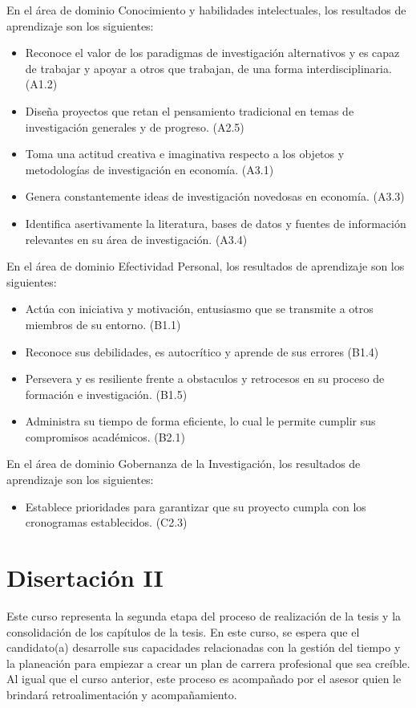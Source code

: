 En el área de dominio Conocimiento y habilidades intelectuales, los resultados de aprendizaje son los siguientes:
\begin{itemize}
\item	Reconoce el valor de los paradigmas de investigación alternativos y es capaz de trabajar y apoyar a otros que trabajan, de una forma interdisciplinaria. (A1.2)
\item	Diseña proyectos que retan el pensamiento tradicional en temas de investigación generales y de progreso. (A2.5)
\item	Toma una actitud creativa e imaginativa respecto a los objetos y metodologías de investigación en economía. (A3.1)
\item	Genera constantemente ideas de investigación novedosas en economía. (A3.3)
\item	Identifica asertivamente la literatura, bases de datos y fuentes de información relevantes en su área de investigación. (A3.4)
\end{itemize}
En el área de dominio Efectividad Personal, los resultados de aprendizaje son los siguientes:
\begin{itemize}
\item	Actúa con iniciativa y motivación, entusiasmo que se transmite a otros miembros de su entorno. (B1.1)
\item	Reconoce sus debilidades, es autocrítico y aprende de sus errores (B1.4)
\item	Persevera y es resiliente frente a obstaculos y retrocesos en su proceso de formación e investigación. (B1.5)
\item	Administra su tiempo de forma eficiente, lo cual le permite cumplir sus compromisos académicos. (B2.1)
\end{itemize}
En el área de dominio Gobernanza de la Investigación, los resultados de aprendizaje son los siguientes:
\begin{itemize}
\item	Establece prioridades para garantizar que su proyecto cumpla con los cronogramas establecidos. (C2.3)
\end{itemize}


\section{Disertación II}

Este curso representa la segunda etapa del proceso de realización de la tesis y la consolidación de los capítulos de la tesis. En este curso, se espera que el candidato(a) desarrolle sus capacidades relacionadas con la gestión del tiempo y la planeación para empiezar a crear un plan de carrera profesional que sea creíble. Al igual que el curso anterior, este proceso es acompañado por el asesor quien le brindará retroalimentación y acompañamiento.

